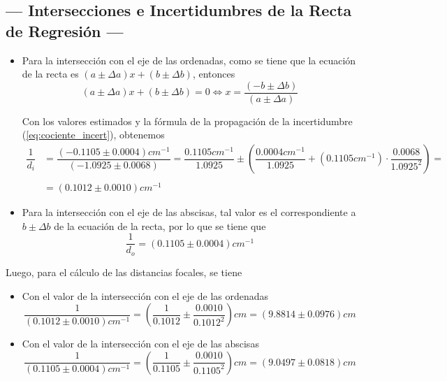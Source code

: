 \documentclass[10pt,a4paper]{article}
\begin{document}
\subsection{--- Intersecciones e Incertidumbres de la Recta de Regresión ---} %
\label{sub:incert_interseccion}
	\begin{itemize}
		\item Para la intersección con el eje de las ordenadas, como se tiene que la ecuación de la recta es $(a\pm \Delta a)x+(b\pm \Delta b)$, entonces
		$$(a\pm \Delta a)x+(b\pm \Delta b)=0\Longleftrightarrow x=\dfrac{(-b\pm \Delta b)}{(a\pm \Delta a)} $$ 
		
			Con los valores estimados y la fórmula de la propagación de la incertidumbre (\ref{eq:cociente_incert}), obtenemos
		\begin{align*}
			\dfrac{1}{d_i}&=\dfrac{(-0.1105\pm 0.0004) cm^{-1}}{(-1.0925\pm 0.0068)}=
			\dfrac{0.1105 cm^{-1}}{1.0925}\pm\left(\dfrac{0.0004 cm^{-1}}{1.0925}+(0.1105 cm^{-1})\cdot \dfrac{0.0068}{1.0925^2}\right)=\\\\
			&=(0.1012\pm 0.0010) cm^{-1}
		\end{align*}
	
		\item Para la intersección con el eje de las abscisas, tal valor es el correspondiente a $b\pm \Delta b$ de la ecuación de la recta, por lo que se tiene que
		$$\dfrac{1}{d_o}=(0.1105\pm 0.0004) cm^{-1} $$
	\end{itemize}
	
	Luego, para el cálculo de las distancias focales, se tiene
	\begin{itemize}
		\item  Con el valor de la intersección con el eje de las ordenadas
		$$\dfrac{1}{(0.1012\pm 0.0010) cm^{-1}}=\left(\dfrac{1}{0.1012}\pm\dfrac{0.0010}{0.1012^2}\right)cm=(9.8814\pm0.0976)cm$$
		
		\item  Con el valor de la intersección con el eje de las abscisas
		$$\dfrac{1}{(0.1105\pm 0.0004) cm^{-1}}=\left(\dfrac{1}{0.1105}\pm\dfrac{0.0010}{0.1105^2}\right)cm=(9.0497\pm 0.0818)cm$$
	\end{itemize}
\end{document}

